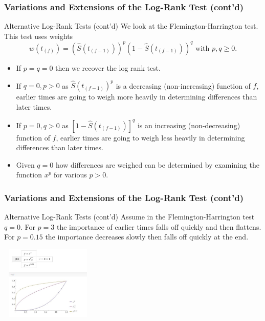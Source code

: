 \documentclass{beamer}
\theoremstyle{definition}
\begin{document}
\begin{frame}
\frametitle{Variations and Extensions of the Log-Rank Test (cont'd)}
\begin{block}{Alternative Log-Rank Tests (cont'd)}
We look at the Flemington-Harrington test. This test uses weights
\[ w(t_{(f)}) = (\hat{S}(t_{(f-1)}))^p (1-\hat{S}(t_{(f-1)}))^q \text{ with } p,q \ge 0.
\]

\begin{itemize}
\item If $p=q=0$ then we recover the log rank test.
\item If $q=0, p>0$ as $\hat{S}(t_{(f-1)})^p $ is a decreasing (non-increasing) function of $f$, earlier times are going to weigh more heavily in determining differences than later times.
\item If $p=0, q>0$ as $[1-\hat{S}(t_{(f-1)})]^q $ is an increasing (non-decreasing) function of $f$, earlier times are going to weigh less heavily in determining differences than later times.
\item Given $q=0$ how differences are weighed can be determined by examining the function $x^p$ for various $p>0$.
\end{itemize}
\end{block}
\end{frame}

\begin{frame}
\frametitle{Variations and Extensions of the Log-Rank Test (cont'd)}
\begin{block}{Alternative Log-Rank Tests (cont'd)}
Assume in the Flemington-Harrington test $q=0$. For $p=3$ the importance of earlier times falls off quickly and then flattens. For $p=0.15$ the importance decreases slowly then falls off quickly at the end.
\begin{center}
\includegraphics[width =4.5cm, height=3.5cm]{Ch2_Flemharringtonplot.JPG}
\end{center}
\end{block}
\end{frame}
\end{document}
